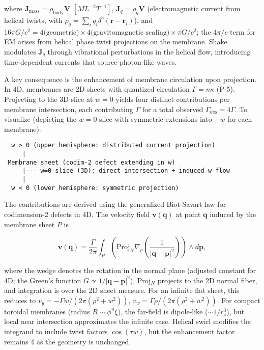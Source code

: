 where $\mathbf{J}_{\text{mass}} = \rho_{\text{body}} \mathbf{V}$ $[M L^{-2} T^{-1}]$, $\mathbf{J}_q = \rho_q \mathbf{V}$ (electromagnetic current from helical twists, with $\rho_q = \sum_i q_i \delta^3(\mathbf{r} - \mathbf{r}_i)$), and $16\pi G/c^2 = 4 \text{(geometric)} \times 4 \text{(gravitomagnetic scaling)} \times \pi G/c^2$; the $4\pi/c$ term for EM arises from helical phase twist projections on the membrane. Shake modulates $\mathbf{J}_q$ through vibrational perturbations in the helical flow, introducing time-dependent currents that source photon-like waves.

A key consequence is the enhancement of membrane circulation upon projection. In 4D, membranes are 2D sheets with quantized circulation $\Gamma = n \kappa$ (P-5). Projecting to the 3D slice at $w=0$ yields four distinct contributions per membrane intersection, each contributing $\Gamma$ for a total observed $\Gamma_{\text{obs}} = 4\Gamma$. To visualize (depicting the $w=0$ slice with symmetric extensions into $\pm w$ for each membrane):

\begin{verbatim}
  w > 0 (upper hemisphere: distributed current projection)
     |
 Membrane sheet (codim-2 defect extending in w)
     |--- w=0 slice (3D): direct intersection + induced w-flow
     |
  w < 0 (lower hemisphere: symmetric projection)
\end{verbatim}

The contributions are derived using the generalized Biot-Savart law for codimension-2 defects in 4D. The velocity field $\mathbf{v}(\mathbf{q})$ at point $\mathbf{q}$ induced by the membrane sheet $P$ is

\[
\mathbf{v}(\mathbf{q}) = \frac{\Gamma}{2\pi} \int_P \left( \text{Proj}_N \nabla_p \left( \frac{1}{|\mathbf{q} - \mathbf{p}|^2} \right) \right) \wedge d\mathbf{p},
\]

where the wedge denotes the rotation in the normal plane (adjusted constant for 4D; the Green's function $G \propto 1/|\mathbf{q}-\mathbf{p}|^2$), Proj$_N$ projects to the 2D normal fiber, and integration is over the 2D sheet measure. For an infinite flat sheet, this reduces to $v_y = -\Gamma w / (2\pi (\rho^2 + w^2))$, $v_w = \Gamma \rho / (2\pi (\rho^2 + w^2))$. For compact toroidal membranes (radius $R \sim \phi^n \xi$), the far-field is dipole-like ($\sim 1/r_4^3$), but local near intersection approximates the infinite case. Helical swirl modifies the integrand to include twist factors $\cos(\tau w)$, but the enhancement factor remains 4 as the geometry is unchanged.

